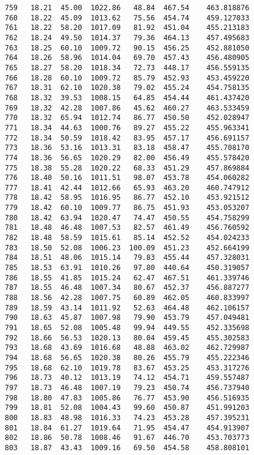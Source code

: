 \documentclass[11pt]{article}
\begin{document}
\begin{tcolorbox}[breakable, size=fbox, boxrule=.5pt, pad at break*=1mm, opacityfill=0]
\begin{Verbatim}[commandchars=\\\{\}]
759   18.21  45.00  1022.86   48.84  467.54    463.818876
760   18.22  45.09  1013.62   75.56  454.74    459.127033
761   18.22  58.20  1017.09   81.92  451.04    455.213183
762   18.24  49.50  1014.37   79.36  464.13    457.495683
763   18.25  60.10  1009.72   90.15  456.25    452.881050
764   18.26  58.96  1014.04   69.70  457.43    456.480905
765   18.27  58.20  1018.34   72.73  448.17    456.559135
766   18.28  60.10  1009.72   85.79  452.93    453.459220
767   18.31  62.10  1020.38   79.02  455.24    454.758135
768   18.32  39.53  1008.15   64.85  454.44    461.437420
769   18.32  42.28  1007.86   45.62  460.27    463.533459
770   18.32  65.94  1012.74   86.77  450.50    452.028947
771   18.34  44.63  1000.76   89.27  455.22    455.963341
772   18.34  50.59  1018.42   83.95  457.17    456.691157
773   18.36  53.16  1013.31   83.18  458.47    455.708170
774   18.36  56.65  1020.29   82.00  456.49    455.578420
775   18.38  55.28  1020.22   68.33  451.29    457.869884
776   18.40  50.16  1011.51   98.07  453.78    454.060282
777   18.41  42.44  1012.66   65.93  463.20    460.747912
778   18.42  58.95  1016.95   86.77  452.10    453.921512
779   18.42  60.10  1009.77   86.75  451.93    453.053207
780   18.42  63.94  1020.47   74.47  450.55    454.758299
781   18.48  46.48  1007.53   82.57  461.49    456.760592
782   18.48  58.59  1015.61   85.14  452.52    454.024233
783   18.50  52.08  1006.23  100.09  451.23    452.664199
784   18.51  48.06  1015.14   79.83  455.44    457.328031
785   18.53  63.91  1010.26   97.80  440.64    450.319057
786   18.55  41.85  1015.24   62.47  467.51    461.339746
787   18.55  46.48  1007.34   80.67  452.37    456.887277
788   18.56  42.28  1007.75   60.89  462.05    460.833997
789   18.59  43.14  1011.92   52.63  464.48    462.106157
790   18.63  45.87  1007.98   79.90  453.79    457.049481
791   18.65  52.08  1005.48   99.94  449.55    452.335698
792   18.66  56.53  1020.13   80.04  459.45    455.302583
793   18.68  43.69  1016.68   48.88  463.02    462.729987
794   18.68  56.65  1020.38   80.26  455.79    455.222346
795   18.68  62.10  1019.78   83.67  453.25    453.317276
796   18.73  40.12  1013.19   74.12  454.71    459.557487
797   18.73  46.48  1007.19   79.23  450.74    456.737940
798   18.80  47.83  1005.86   76.77  453.90    456.516935
799   18.81  52.08  1004.43   99.60  450.87    451.991203
800   18.83  48.98  1016.33   74.23  453.28    457.395231
801   18.84  61.27  1019.64   71.95  454.47    454.913907
802   18.86  50.78  1008.46   91.67  446.70    453.703773
803   18.87  43.43  1009.16   69.50  454.58    458.808101

\end{Verbatim}
\end{tcolorbox}
\end{document}
